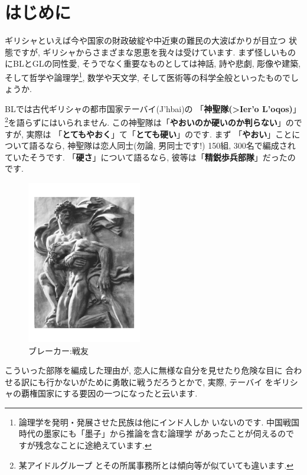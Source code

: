 \section{はじめに}

ギリシャといえば今や国家の財政破綻や中近東の難民の大波ばかりが目立つ
状態ですが, ギリシャからさまざまな恩恵を我々は受けています. まず怪しいもの
にBLとGLの同性愛, そうでなく重要なものとしては神話, 詩や悲劇, 彫像や建築,
 そして哲学や論理学\footnote{論理学を発明・発展させた民族は他にインド人しか
いないのです. 中国戦国時代の墨家にも「墨子」\cite{墨子}から推論を含む論理学
があったことが伺えるのですが残念なことに途絶えています.}, 数学や天文学,
 そして医術等の科学全般といったものでしょうか.
\newline

BLでは古代ギリシャの都市国家テーバイ(\textgreek{J'hbai})の
「\textbf{神聖隊(\textgreek{>Ier'o L'oqos})}」\footnote{某アイドルグループ
とその所属事務所とは傾向等が似ていても違います.}を語らずにはいられません.
 この神聖隊は「\textbf{やおいのか硬いのか判らない}」のですが, 実際は
「\textbf{とてもやおく}」て「\textbf{とても硬い}」のです. まず
「\textbf{やおい}」ことについて語るなら, 神聖隊は恋人同士(勿論, 男同士です!)
150組, 300名で編成されていたそうです. 「\textbf{硬さ}」について語るなら,
 彼等は「\textbf{精鋭歩兵部隊}」だったのです.
\newline
 
 
\begin{figure}
\includegraphics[width=5cm]{arno_breker_kameradschaft.pdf}
\caption{ブレーカー:戦友}
\label{fig:breker2}
\end{figure}

こういった部隊を編成した理由が, 恋人に無様な自分を見せたり危険な目に
合わせる訳にも行かないがために勇敢に戦うだろうとかで, 実際, テーバイ
をギリシャの覇権国家にする要因の一つになったと云います.
\newline

